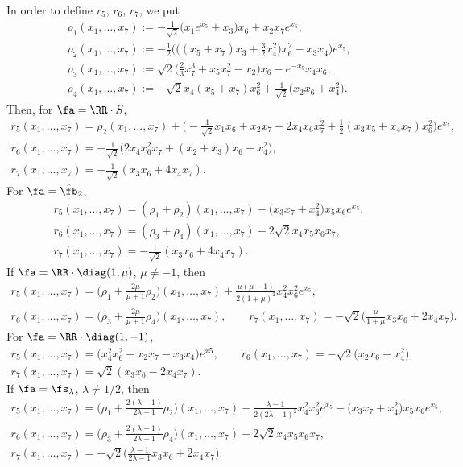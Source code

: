 In order to define $r_5$, $r_6$, $r_7$, we put
\begin{gather*}
\rho_1(x_1,\dots,x_7) := -\tfrac1{\sqrt2}\big(x_1e^{x_5}+x_3\big)x_6+x_2x_7e^{x_5} ,\\
\rho_2(x_1,\dots,x_7) := -\tfrac12\big(\big((x_5+x_7)x_3+\tfrac32 x_4^2\big)x_6^2-x_3x_4\big)e^{x_5}, \\
\rho_3(x_1,\dots,x_7) := \sqrt 2 \big(\tfrac23 x_7^3+x_5x_7^2-x_2\big)x_6-e^{-x_5}x_4x_6 ,\\
\rho_4(x_1,\dots,x_7) := -\sqrt 2x_4(x_5+x_7)x_6^2+\tfrac 1{\sqrt 2}\big(x_2x_6+x_4^2\big).
\end{gather*}
Then, for $\fa=\RR\cdot S$,
\begin{gather*}
r_5(x_1,\dots, x_7) = \rho_2(x_1,\dots,x_7)+ \big({-}\tfrac 1{\sqrt2} x_1x_6+x_2x_7-2x_4x_6x_7^2+\tfrac12(x_3x_5+x_4x_7)x_6^2\big)e^{x_5},\\
r_6(x_1,\dots, x_7) = -\tfrac 1{\sqrt2}\big( 2x_4x_6^2x_7 +(x_2+x_3)x_6-x_4^2\big) , \\
r_7(x_1,\dots, x_7) = -\tfrac1{\sqrt2}(x_3x_6+4x_4x_7).
\end{gather*}
For $\fa=\hat \fb_2$,
\begin{gather*}
r_5(x_1,\dots, x_7) = (\rho_1+\rho_2)(x_1,\dots,x_7)-\big(x_3x_7+x_4^2\big)x_5x_6 e^{x_5}, \\
r_6(x_1,\dots, x_7) = (\rho_3+\rho_4)(x_1,\dots,x_7)-2\sqrt2 x_4x_5x_6x_7 , \\
r_7(x_1,\dots, x_7) = -\tfrac1{\sqrt2}(x_3x_6+4x_4x_7).
\end{gather*}
If $\fa=\RR\cdot\diag(1,\mu)$, $\mu\not=-1$, then
\begin{gather*}
r_5(x_1,\dots, x_7) = \big(\rho_1+\tfrac{2\mu}{\mu+1}\rho_2\big)(x_1,\dots, x_7)+\tfrac{\mu(\mu-1)}{2(1+\mu)^2}x_4^2x_6^2e^{x_5}, \\
r_6(x_1,\dots, x_7) = \big(\rho_3+\tfrac{2\mu}{\mu+1}\rho_4\big)(x_1,\dots, x_7), \qquad
r_7(x_1,\dots, x_7) = -\sqrt2\big(\tfrac{\mu}{1+\mu}x_3x_6 +2x_4x_7\big).
\end{gather*}
For $\fa=\RR\cdot\diag(1,-1)$,
\begin{gather*}
r_5(x_1,\dots, x_7) = \big(x_4^2x_6^2+x_2x_7-x_3x_4\big)e^{x5}, \qquad
r_6(x_1,\dots, x_7) = -\sqrt2\big(x_2x_6+x_4^2\big), \\
r_7(x_1,\dots, x_7) = \sqrt2(x_3x_6-2x_4x_7).
\end{gather*}
If $\fa=\fs_\lambda$, $\lambda\not=1/2$, then
\begin{gather*}
r_5(x_1,\dots, x_7) = \big(\rho_1+\tfrac{2(\lambda-1)}{2\lambda-1}\rho_2\big)(x_1,\dots,x_7) -\tfrac{\lambda-1}{2(2\lambda-1)^2}x_4^2x_6^2e^{x_5}-\big(x_3x_7+x_4^2\big)x_5x_6e^{x_5}, \\
r_6(x_1,\dots, x_7) = \big(\rho_3+\tfrac{2(\lambda-1)}{2\lambda-1}\rho_4\big)(x_1,\dots,x_7)-2\sqrt2 x_4x_5x_6x_7,\\
r_7(x_1,\dots, x_7) = -\sqrt2 \big(\tfrac{\lambda-1}{2\lambda -1}x_3x_6+2 x_4 x_7\big).
\end{gather*}
